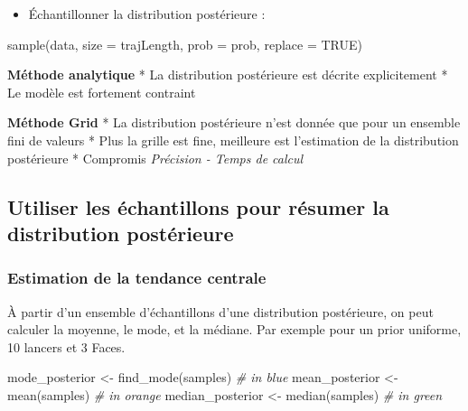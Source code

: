 \documentclass[
  a4paper,11pt,twoside,onecolumn,openright,final,oldfontcommands]{memoir}
\newenvironment{Shaded}{\begin{snugshade}}{\end{snugshade}}
\newcommand{\AttributeTok}[1]{\textcolor[rgb]{0.77,0.63,0.00}{#1}}
\newcommand{\CommentTok}[1]{\textcolor[rgb]{0.56,0.35,0.01}{\textit{#1}}}
\newcommand{\ConstantTok}[1]{\textcolor[rgb]{0.00,0.00,0.00}{#1}}
\newcommand{\FunctionTok}[1]{\textcolor[rgb]{0.00,0.00,0.00}{#1}}
\newcommand{\NormalTok}[1]{#1}
\newcommand{\OtherTok}[1]{\textcolor[rgb]{0.56,0.35,0.01}{#1}}
\providecommand{\tightlist}{%
  \setlength{\itemsep}{0pt}\setlength{\parskip}{0pt}}
\theoremstyle{definition}
\theoremstyle{definition}
\theoremstyle{definition}
\theoremstyle{remark}
\begin{document}
\begin{itemize}
\tightlist
\item
  Échantillonner la distribution postérieure :
\end{itemize}

\begin{Shaded}
\begin{Highlighting}[]
\FunctionTok{sample}\NormalTok{(data, }\AttributeTok{size =}\NormalTok{ trajLength, }\AttributeTok{prob =}\NormalTok{ prob, }\AttributeTok{replace =} \ConstantTok{TRUE}\NormalTok{)}
\end{Highlighting}
\end{Shaded}

\textbf{Méthode analytique}
* La distribution postérieure est décrite explicitement
* Le modèle est fortement contraint

\textbf{Méthode Grid}
* La distribution postérieure n'est donnée que pour un ensemble fini de valeurs
* Plus la grille est fine, meilleure est l'estimation de la distribution postérieure
* Compromis \emph{Précision - Temps de calcul}

\hypertarget{utiliser-les-uxe9chantillons-pour-ruxe9sumer-la-distribution-postuxe9rieure}{%
\subsection{Utiliser les échantillons pour résumer la distribution postérieure}\label{utiliser-les-uxe9chantillons-pour-ruxe9sumer-la-distribution-postuxe9rieure}}

\hypertarget{estimation-de-la-tendance-centrale}{%
\subsubsection{Estimation de la tendance centrale}\label{estimation-de-la-tendance-centrale}}

À partir d'un ensemble d'échantillons d'une distribution postérieure, on peut calculer la moyenne, le mode, et la médiane. Par exemple pour un prior uniforme, 10 lancers et 3 Faces.

\begin{Shaded}
\begin{Highlighting}[]
\NormalTok{mode\_posterior }\OtherTok{\textless{}{-}} \FunctionTok{find\_mode}\NormalTok{(samples) }\CommentTok{\# in blue}
\NormalTok{mean\_posterior }\OtherTok{\textless{}{-}} \FunctionTok{mean}\NormalTok{(samples) }\CommentTok{\# in orange}
\NormalTok{median\_posterior }\OtherTok{\textless{}{-}} \FunctionTok{median}\NormalTok{(samples) }\CommentTok{\# in green}
\end{Highlighting}
\end{Shaded}
\end{document}
